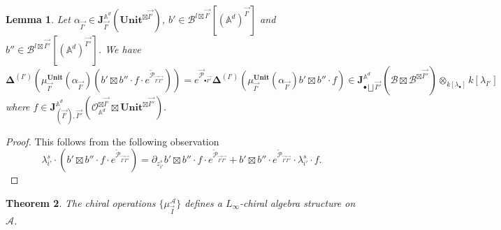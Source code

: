 \documentclass[11pt]{amsart}
\newtheorem{thm}{Theorem}[section]
\newtheorem{lem}[thm]{Lemma}
\theoremstyle{definition}
\theoremstyle{remark}
\numberwithin{equation}{section}
\begin{document}
\iffalse
$$
\mathbf{L}=\frac{\mathbf{J}_{\mathring{\mathbb{A}^d}}\otimes L^{\vee}[d-1]\oplus \mathbf{J}_{\mathring{\mathbb{A}^d}}(\omega_{\mathbb{A}^d}^{-1})\otimes L}{\mathcal{O}[\mathbb{A}^d]\otimes L^{\vee}[d-1]\oplus \omega_{\mathbb{A}^d}^{-1}[\mathbb{A}^d]\otimes L}
$$
\fi
\begin{lem}
    Let $\alpha_{\vec{I'}}\in \mathbf{J}^{\mathbb{A}^d}_{\vec{I'}}(\mathbf{Unit}^{\boxtimes \vec{I'}}) $, $b'\in \mathcal{B}^{l\boxtimes \vec{I'}}[(\mathbb{A}^d)^{\vec{I'}}] $ and $b''\in \mathcal{B}^{l\boxtimes \vec{I''}}[(\mathbb{A}^d)^{\vec{I''}}] $. We have
    $$
    \mathbf{\Delta}^{(I')}\left(\mu^{\mathbf{Unit}}_{\vec{I'}}(\alpha_{\vec{I'}})(b'\boxtimes b''\cdot f\cdot e^{\overleftarrow{\mathcal{P}}_{\vec{I'}\vec{I''}}})\right)=e^{\overrightarrow{\mathcal{P}}_{\bullet\overrightarrow{I''}}}\mathbf{\Delta}^{(I')}\left(\mu^{\mathbf{Unit}}_{\vec{I'}}(\alpha_{\vec{I'}})b'\boxtimes b''\cdot f \right)\in \mathbf{J}_{\bullet\bigsqcup\vec{I''}}^{\mathbb{A}^d}(\mathcal{B}\boxtimes \mathcal{B}^{\boxtimes\vec{I''}})\otimes_{k[\lambda_{\bullet}]}k[\lambda_{I'}]
    $$
    where $f\in \mathbf{J}_{(\vec{I'}),\vec{{I''}}}^{\mathbb{A}^d}(\mathcal{O}_{\mathbb{A}^d}^{\boxtimes\overrightarrow{I'}}\boxtimes\mathbf{Unit}^{\boxtimes\vec{I''}}).
$
\end{lem}
\begin{proof}
    This follows from the following observation
    $$
    \lambda^s_{i'}\cdot \left(b'\boxtimes b''\cdot f\cdot e^{\overleftarrow{\mathcal{P}}_{\vec{I'}\vec{I''}}}\right)=\partial_{z^s_{i'}}b'\boxtimes b''\cdot f\cdot e^{\overleftarrow{\mathcal{P}}_{\vec{I'}\vec{I''}}}+b'\boxtimes b''\cdot e^{\overleftarrow{\mathcal{P}}_{\vec{I'}\vec{I''}}}\cdot \lambda^s_{i'} \cdot f.
    $$
\end{proof}
\begin{thm}
    The chiral operations $\{\mu^{\mathcal{A}}_{\vec{I}}\}$ defines a $L_{\infty}$-chiral algebra structure on $\mathcal{A}$.
\end{thm}
\end{document}
